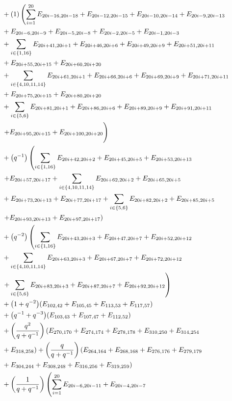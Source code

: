 \documentclass[pdftex]{sigma}
\numberwithin{equation}{section}
\theoremstyle{definition}
\begin{document}
\begin{align*}
&+(1)\left( \sum_{i=1}^{20} E_{20i-16,20i-18} + E_{20i-12,20i-15} + E_{20i-10,20i-14} + E_{20i-9,20i-13} \right. \\
&+ E_{20i-6,20i-9}+ E_{20i-5,20i-8} + E_{20i-2,20i-5} + E_{20i-1,20i-3}\\
&+\sum_{i \in \{1,16\}} E_{20i+41,20i+1} + E_{20i+46,20i+6} + E_{20i+49,20i+9} + E_{20i+51,20i+11} \\
&+ E_{20i+55,20i+15}+E_{20i+60,20i+20} \\
&+\sum_{i \in \{4,10,11,14\}} E_{20i+61,20i+1} + E_{20i+66,20i+6} + E_{20i+69,20i+9} + E_{20i+71,20i+11} \\
& + E_{20i+75,20i+15}+E_{20i+80,20i+20} \\
&+\sum_{i \in \{5,6\}} E_{20i+81,20i+1} + E_{20i+86,20i+6} + E_{20i+89,20i+9} + E_{20i+91,20i+11} \\
&\left.+ E_{20i+95,20i+15}+E_{20i+100,20i+20} \vphantom{\sum_{i=1}^{20}}\right) \\
&+\bigl(q^{-1}\bigr)\left( \sum_{i \in \{1,16\}} E_{20i+42,20i+2} + E_{20i+45,20i+5} + E_{20i+53,20i+13} \right.\\
&\left. + E_{20i+57,20i+17}+\sum_{i \in \{4,10,11,14\}} E_{20i+62,20i+2} + E_{20i+65,20i+5} \right.\\
&+ E_{20i+73,20i+13} + E_{20i+77,20i+17} +\sum_{i \in \{5,6\}} E_{20i+82,20i+2} + E_{20i+85,20i+5} \\
&\left.+ E_{20i+93,20i+13} + E_{20i+97,20i+17} \right) \\
&+\bigl(q^{-2}\bigr)\left( \sum_{i \in \{1,16\}} E_{20i+43,20i+3} + E_{20i+47,20i+7} + E_{20i+52,20i+12}\right.\\
&+\sum_{i \in \{4,10,11,14\}} E_{20i+63,20i+3} + E_{20i+67,20i+7} + E_{20i+72,20i+12} \\
&\left. +\sum_{i \in \{5,6\}} E_{20i+83,20i+3} + E_{20i+87,20i+7} + E_{20i+92,20i+12} \right) \\
&+\bigl(1 + q^{-2}\bigr)(E_{102,42}+E_{105,45}+E_{113,53}+E_{117,57})\\
&+\bigl(q^{-1} + q^{-3}\bigr)(E_{103,43}+E_{107,47}+E_{112,52})\\
&+\left(\frac{q^2}{q + q^{-1}}\right)(E_{270,170}+E_{274,174}+E_{278,178}+E_{310,250}+E_{314,254}\\
&+E_{318,258})+\left(\frac{q}{q + q^{-1}}\right)(E_{264,164}+E_{268,168}+E_{276,176}+E_{279,179}\\
&+E_{304,244}+E_{308,248}+E_{316,256}+E_{319,259})\\
&+\left(\frac{1}{q + q^{-1}}\right)\left( \sum_{i=1}^{20} E_{20i-6,20i-11} + E_{20i-4,20i-7} \vphantom{\sum_{j \in \{1,6,9,11,15,20\}}}\right.\\

\end{align*}
\end{document}
